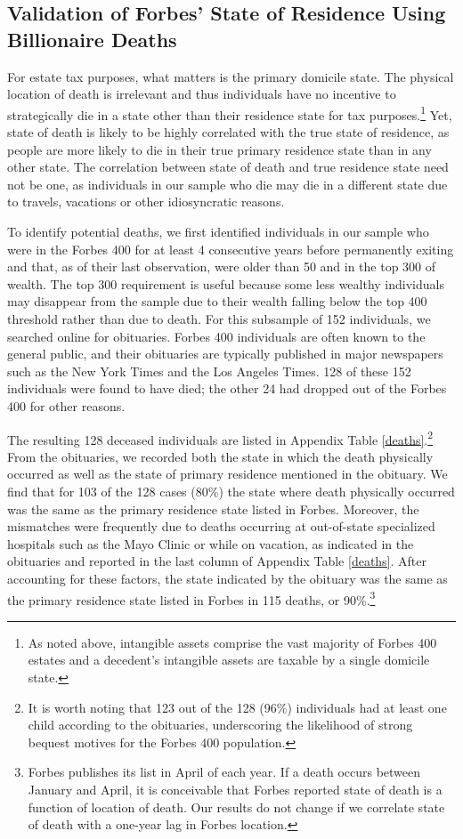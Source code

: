 \documentclass[12pt]{article}
\begin{document}
 
\subsection{Validation of Forbes' State of Residence Using Billionaire Deaths}

For estate tax purposes, what matters is the primary domicile state. The physical location of death is irrelevant and thus individuals have no incentive to strategically die in a state other than their residence state for tax purposes.\footnote{As noted above, intangible assets comprise the vast majority of Forbes 400 estates and a decedent's intangible assets are taxable by a {single} domicile state.}
Yet, state of death is likely to be highly correlated with the true state of residence, as people are more likely to die in their true primary residence state than in any other state. 
The correlation between state of death and true residence state need not be one, as individuals in our sample who die may die in a different state due to travels, vacations or other idiosyncratic reasons.

To identify potential deaths, we first identified individuals in our sample who were in the Forbes 400 for at least 4 consecutive years before permanently exiting and that, as of their last observation, were older than 50 and in the top 300 of wealth. The top 300 requirement is useful because some less wealthy individuals may disappear from the sample due to their wealth falling below the top 400 threshold rather than due to death. For this subsample of 152 individuals, we searched online for obituaries. Forbes 400 individuals are often known to the general public, and their obituaries are typically published in major newspapers such as the New York Times and the Los Angeles Times. 128 of these 152 individuals were found to have died; the other 24 had dropped out of the Forbes 400 for other reasons. 

The resulting 128 deceased individuals are listed in Appendix Table \ref{deaths}.\footnote{It is worth noting that 123 out of the 128 (96\%) individuals had at least one child according to the obituaries, underscoring the likelihood of strong bequest motives for the Forbes 400 population.} From the obituaries, we recorded both the state in which the death physically occurred as well as the state of primary residence mentioned in the obituary. We find that for 103 of the 128 cases (80\%) the state where death physically occurred was the same as the primary residence state listed in Forbes. Moreover, the mismatches were frequently due to deaths occurring at out-of-state specialized hospitals such as the Mayo Clinic or while on vacation, as indicated in the obituaries and reported in the last column of Appendix Table \ref{deaths}. After accounting for these factors, the state indicated by the obituary was the same as the primary residence state listed in Forbes in 115 deaths, or 90\%.\footnote{Forbes publishes its list in April of each year. If a death occurs between January and April, it is conceivable that Forbes reported state of death is a function of location of death. Our results do not change if we correlate state of death with a one-year lag in Forbes location.}
\end{document}
